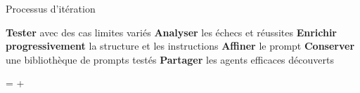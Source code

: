 \begin{bfbox}{Processus d'itération}
    \begin{tcbenumerate}[2]
        \tcbitem \textbf{Tester} avec des cas limites variés
        \tcbitem \textbf{Analyser} les échecs et réussites
        \tcbitem \textbf{Enrichir progressivement} la structure et les instructions
        \tcbitem \textbf{Affiner} le prompt
        \tcbitem \textbf{Conserver} une bibliothèque de prompts testés
        \tcbitem \textbf{Partager} les agents efficaces découverts
    \end{tcbenumerate}
    \begin{center}
            {\huge =}
            {\huge +} 
            \\

    \end{center}

    
\end{bfbox}